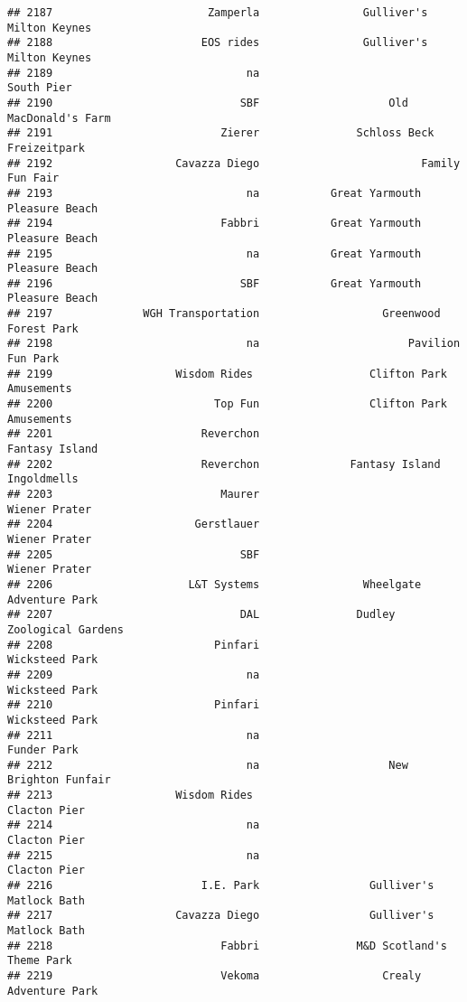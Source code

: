 \documentclass[
]{article}
\begin{document}
\begin{verbatim}
## 2187                        Zamperla                Gulliver's Milton Keynes
## 2188                       EOS rides                Gulliver's Milton Keynes
## 2189                              na                              South Pier
## 2190                             SBF                    Old MacDonald's Farm
## 2191                          Zierer               Schloss Beck Freizeitpark
## 2192                   Cavazza Diego                         Family Fun Fair
## 2193                              na           Great Yarmouth Pleasure Beach
## 2194                          Fabbri           Great Yarmouth Pleasure Beach
## 2195                              na           Great Yarmouth Pleasure Beach
## 2196                             SBF           Great Yarmouth Pleasure Beach
## 2197              WGH Transportation                   Greenwood Forest Park
## 2198                              na                       Pavilion Fun Park
## 2199                   Wisdom Rides                  Clifton Park Amusements
## 2200                         Top Fun                 Clifton Park Amusements
## 2201                       Reverchon                          Fantasy Island
## 2202                       Reverchon              Fantasy Island Ingoldmells
## 2203                          Maurer                           Wiener Prater
## 2204                      Gerstlauer                           Wiener Prater
## 2205                             SBF                           Wiener Prater
## 2206                     L&T Systems                Wheelgate Adventure Park
## 2207                             DAL               Dudley Zoological Gardens
## 2208                         Pinfari                          Wicksteed Park
## 2209                              na                          Wicksteed Park
## 2210                         Pinfari                          Wicksteed Park
## 2211                              na                             Funder Park
## 2212                              na                    New Brighton Funfair
## 2213                   Wisdom Rides                             Clacton Pier
## 2214                              na                            Clacton Pier
## 2215                              na                            Clacton Pier
## 2216                       I.E. Park                 Gulliver's Matlock Bath
## 2217                   Cavazza Diego                 Gulliver's Matlock Bath
## 2218                          Fabbri               M&D Scotland's Theme Park
## 2219                          Vekoma                   Crealy Adventure Park

\end{verbatim}
\end{document}
